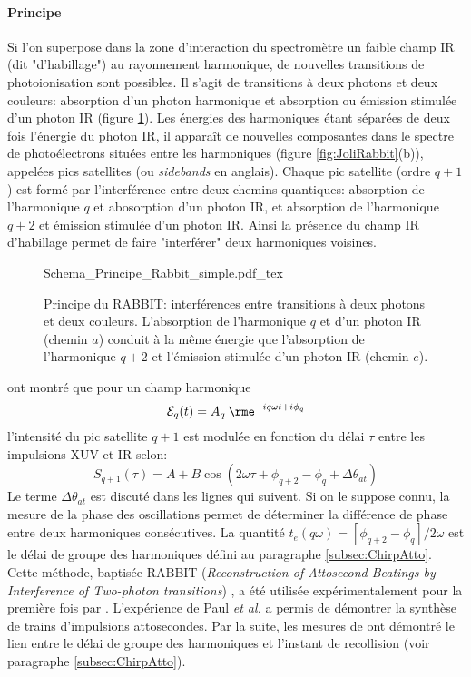 \paragraph{Principe} Si l'on superpose dans la zone d'interaction du spectromètre un faible champ IR (dit "d'habillage") au rayonnement harmonique, de nouvelles transitions de photoionisation sont possibles. Il s'agit de transitions à deux photons et deux couleurs: absorption d'un photon harmonique et absorption ou émission stimulée d'un photon IR (figure \ref{fig:PrincipeRabbit2}). Les énergies des harmoniques étant séparées de deux fois l'énergie du photon IR, il apparaît de nouvelles composantes dans le spectre de photoélectrons situées entre les harmoniques (figure \ref{fig:JoliRabbit}(b)), appelées pics satellites (ou \textit{sidebands} en anglais). Chaque pic satellite (ordre $q+1$) est formé par l'interférence entre deux chemins quantiques: absorption de l'harmonique $q$ et abosorption d'un photon IR, et absorption de l'harmonique $q+2$ et émission stimulée d'un photon IR. Ainsi la présence du champ IR d'habillage permet de faire "interférer" deux harmoniques voisines.

\begin{figure}[ht]
\centering
\def\svgwidth{0.5\columnwidth}
{Schema_Principe_Rabbit_simple.pdf_tex}
\caption{Principe du RABBIT: interférences entre transitions à deux photons et deux couleurs. L'absorption de l'harmonique $q$ et d'un photon IR (chemin $a$) conduit à la même énergie que l'absorption de l'harmonique $q+2$ et l'émission stimulée d'un photon IR (chemin $e$).}
\label{fig:PrincipeRabbit2}
\end{figure}

  ont montré que  pour un champ harmonique
\begin{equation}
\mathcal{E}_q(t) = A_q \: \rme^{-iq\omega t + i\phi_q}
\end{equation}
l'intensité du pic satellite $q+1$ est modulée en fonction du délai $\tau$ entre les impulsions XUV et IR selon:
\begin{equation}
S_{q+1}(\tau) = A + B \cos(2\omega \tau + \phi_{q+2} - \phi_q + \Delta \theta_{at})
\label{eq:Rabbit_simple}
\end{equation}
Le terme $\Delta \theta_{at}$ est discuté dans les lignes qui suivent. Si on le suppose connu, la mesure de la phase des oscillations permet de déterminer la différence de phase entre deux harmoniques consécutives. La quantité $t_e (q\omega) = [\phi_{q+2} - \phi_q] / 2\omega$ est le délai de groupe des harmoniques défini au paragraphe \ref{subsec:ChirpAtto}. Cette méthode, baptisée RABBIT (\textit{Reconstruction of Attosecond Beatings by Interference of Two-photon transitions}) , a été utilisée expérimentalement pour la première fois par . L'expérience de Paul \textit{et al.} a permis de démontrer la synthèse de trains d'impulsions attosecondes. Par la suite, les mesures de  ont démontré le lien entre le délai de groupe des harmoniques et l'instant de recollision (voir paragraphe \ref{subsec:ChirpAtto}). 

